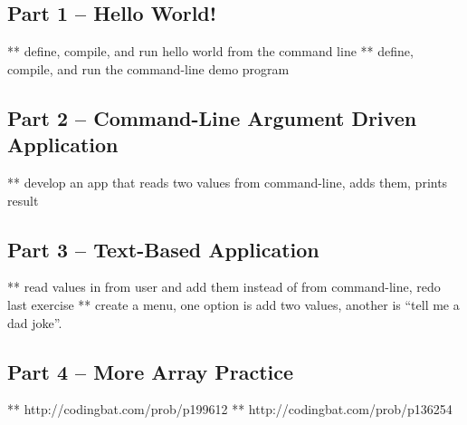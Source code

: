 \subsection{Part 1 -- Hello World!}
** define, compile, and run hello world from the command line
** define, compile, and run the command-line demo program

\initialbox
\subsection{Part 2 -- Command-Line Argument Driven Application}

** develop an app that reads two values from command-line, adds them, prints result

\initialbox
\subsection{Part 3 -- Text-Based Application}

** read values in from user and add them instead of from command-line, redo last exercise
** create a menu, one option is add two values, another is ``tell me a dad joke''. 

\initialbox
\subsection{Part 4 -- More Array Practice}
** http://codingbat.com/prob/p199612
** http://codingbat.com/prob/p136254

\initialbox
